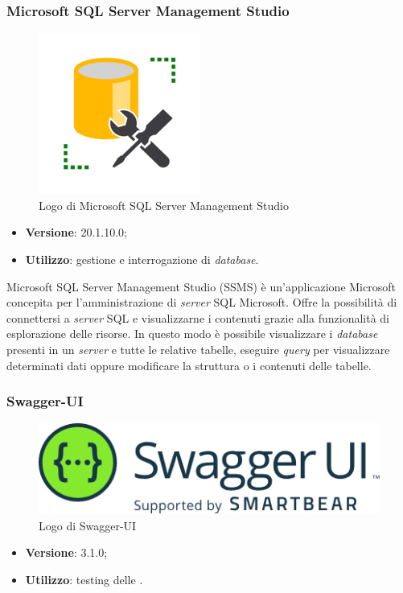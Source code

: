 \subsubsection{Microsoft SQL Server Management Studio}

\begin{figure}[H]
    \centering 
    \includegraphics[width=0.25\columnwidth]{images/loghi/sql_server.png} 
    \caption{Logo di Microsoft SQL Server Management Studio}
\end{figure}

\begin{itemize}
    \item \textbf{Versione}: 20.1.10.0;
    \item \textbf{Utilizzo}: gestione e interrogazione di \textit{database}.
\end{itemize}

\noindent Microsoft SQL Server Management Studio (SSMS) è un'applicazione Microsoft concepita per l'amministrazione di \textit{server} SQL Microsoft. Offre la possibilità di connettersi a \textit{server} SQL e visualizzarne i contenuti grazie alla funzionalità di esplorazione delle risorse. In questo modo è possibile visualizzare i \textit{database} presenti in un \textit{server} e tutte le relative tabelle, eseguire \textit{query} per visualizzare determinati dati oppure modificare la struttura o i contenuti delle tabelle.

\subsubsection{Swagger-UI}

\begin{figure}[H]
    \centering 
    \includegraphics[width=0.4\columnwidth]{images/loghi/swagger.png} 
    \caption{Logo di Swagger-UI}
\end{figure}

\begin{itemize}
    \item \textbf{Versione}: 3.1.0;
    \item \textbf{Utilizzo}: testing delle .
\end{itemize}

